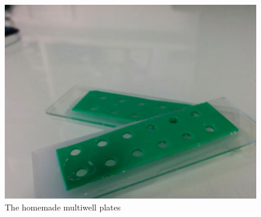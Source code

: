 \documentclass[12pt,a4paper, twocolumn]{article}
\begin{document}
\begin{figure}
\includegraphics[width=\linewidth]{plates.png}

\label{multiwellplates}
\caption{The homemade multiwell plates}
\end{figure}






\end{document}
